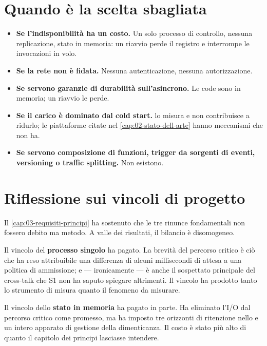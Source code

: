 \section{Quando \nf{} \`e la scelta sbagliata}

\begin{itemize}[leftmargin=*]
  \item \textbf{Se l'indisponibilit\`a ha un costo.} Un solo processo di
  controllo, nessuna replicazione, stato in memoria: un riavvio perde il
  registro e interrompe le invocazioni in volo.
  \item \textbf{Se la rete non \`e fidata.} Nessuna autenticazione, nessuna
  autorizzazione.
  \item \textbf{Se servono garanzie di durabilit\`a sull'asincrono.} Le code
  sono in memoria; un riavvio le perde.
  \item \textbf{Se il carico \`e dominato dal cold start.} \nf{} lo misura e non
  contribuisce a ridurlo; le piattaforme citate nel
  \cref{cap:02-stato-dell-arte} hanno meccanismi che \nf{} non ha.
  \item \textbf{Se servono composizione di funzioni, trigger da sorgenti di
  eventi, versioning o traffic splitting.} Non esistono.
\end{itemize}

\section{Riflessione sui vincoli di progetto}

Il \cref{cap:03-requisiti-principi} ha sostenuto che le tre rinunce fondamentali
non fossero debito ma metodo. A valle dei risultati, il bilancio \`e
disomogeneo.

Il vincolo del \textbf{processo singolo} ha pagato. La brevit\`a del percorso
critico \`e ci\`o che ha reso attribuibile una differenza di alcuni millisecondi
di attesa a una politica di ammissione; e --- ironicamente --- \`e anche il
sospettato principale del cross-talk che S1 non ha saputo spiegare altrimenti.
Il vincolo ha prodotto tanto lo strumento di misura quanto il fenomeno da
misurare.

Il vincolo dello \textbf{stato in memoria} ha pagato in parte. Ha eliminato l'I/O
dal percorso critico come promesso, ma ha imposto tre orizzonti di ritenzione
nello  e un intero apparato di gestione della dimenticanza.
Il costo \`e stato pi\`u alto di quanto il capitolo dei principi lasciasse
intendere.

